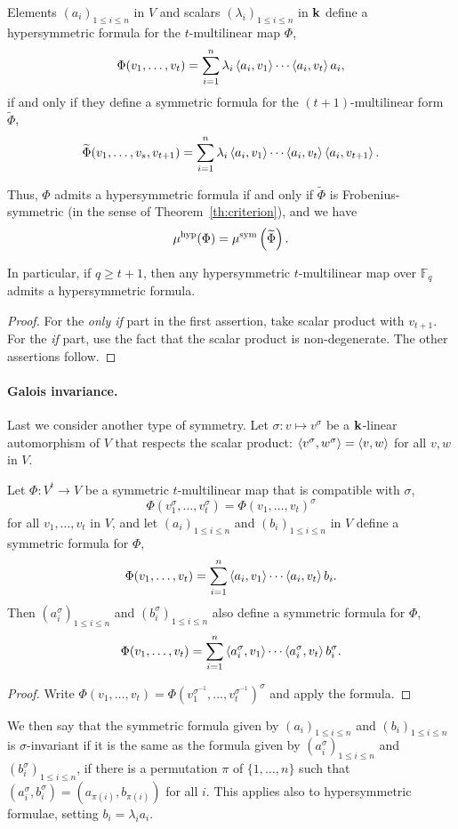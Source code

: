 \documentclass[11pt]{article}
\begin{document}
\begin{lm}
\label{lm:hyp=symtilde}
Elements $(a_i)_{1\leq i\leq n}$ in $V$ and scalars $(\lambda_i)_{1\leq i\leq n}$ in $\mathbf{k}$ define a hypersymmetric formula for the $t$-multilinear map $\Phi$,
\[
\Phi(v_1,\dots,v_t)=\sum_{i=1}^{n}\lambda_i\left\langle a_i,v_1\right\rangle\cdots\left\langle a_i,v_t\right\rangle a_i,
\]
if and only if they define a symmetric formula for the $(t+1)$-multilinear form $\widetilde{\Phi}$,
\[
\widetilde{\Phi}(v_1,\dots,v_s,v_{t+1})=\sum_{i=1}^{n}\lambda_i\left\langle a_i,v_1\right\rangle\cdots\left\langle a_i,v_t\right\rangle\left\langle a_i,v_{t+1}\right\rangle.
\]

Thus, $\Phi$ admits a hypersymmetric formula if and only if $\widetilde{\Phi}$ is Frobenius-symmetric (in the sense of Theorem~\ref{th:criterion}),
and we have
\[
\mu^{\textrm{hyp}}(\Phi)=\mu^{\textrm{sym}}\left(\widetilde{\Phi}\right).
\]

In particular, if $q\geq t+1$, then any hypersymmetric $t$-multilinear map over $\mathbb{F}_q$ admits a hypersymmetric formula.
\end{lm}
\begin{proof}
For the \emph{only if} part in the first assertion, take scalar product with $v_{t+1}$. For the \emph{if} part, use the fact that the scalar product is non-degenerate. The other assertions follow.
\end{proof}

\paragraph{Galois invariance.}
Last we consider another type of symmetry.
Let $\sigma:v\mapsto v^\sigma$ be a $\mathbf{k}$-linear automorphism of $V$
that respects the scalar product: $\left\langle v^\sigma,w^\sigma\right\rangle=\left\langle v,w\right\rangle$ for all $v,w$ in $V$.
\begin{lm}
\label{lm:symGalois}
Let $\Phi:V^t\to V$ be a symmetric $t$-multilinear map that is compatible with $\sigma$, \ie
\[
\Phi(v_1^\sigma,\dots,v_t^\sigma)=\Phi(v_1,\dots,v_t)^\sigma
\]
for all $v_1,\dots,v_t$ in $V$,
and let $(a_i)_{1\leq i\leq n}$ and $(b_i)_{1\leq i\leq n}$ in $V$ define a symmetric formula for $\Phi$,
\[
\Phi(v_1,\dots,v_t)=\sum_{i=1}^{n}\left\langle a_i,v_1\right\rangle\cdots\left\langle a_i,v_t\right\rangle b_i.
\]
Then $(a_i^\sigma)_{1\leq i\leq n}$ and $(b_i^\sigma)_{1\leq i\leq n}$ also define a symmetric formula for $\Phi$,
\[
\Phi(v_1,\dots,v_t)=\sum_{i=1}^{n}\left\langle a_i^\sigma,v_1\right\rangle\cdots\left\langle a_i^\sigma,v_t\right\rangle b_i^\sigma.
\]
\end{lm}
\begin{proof}
Write $\Phi(v_1,\dots,v_t)=\Phi(v_1^{\sigma^{-1}},\dots,v_t^{\sigma^{-1}})^\sigma$ and apply the formula.
\end{proof}
We then say that the symmetric formula given by $(a_i)_{1\leq i\leq n}$ and $(b_i)_{1\leq i\leq n}$ is $\sigma$-invariant if it is the same as the formula given by $(a_i^\sigma)_{1\leq i\leq n}$ and $(b_i^\sigma)_{1\leq i\leq n}$,
\ie if there is a permutation $\pi$ of $\{1,\dots,n\}$ such that $(a_i^\sigma,b_i^\sigma)=(a_{\pi(i)},b_{\pi(i)})$ for all $i$. This applies also to hypersymmetric formulae, setting $b_i=\lambda_i a_i$.
\end{document}
